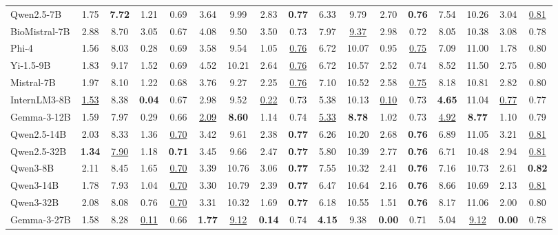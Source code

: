 \begin{table}[t]
{\begin{tabular}{l cccc cccc cccc cccc}
Qwen2.5-7B & 1.75 & \textbf{7.72} & 1.21 & 0.69 & 3.64 & 9.99 & 2.83 & \textbf{0.77} & 6.33 & 9.79 & 2.70 & \textbf{0.76} & 7.54 & 10.26 & 3.04 & \underline{0.81} \\
BioMistral-7B & 2.88 & 8.70 & 3.05 & 0.67 & 4.08 & 9.50 & 3.50 & 0.73 & 7.97 & \underline{9.37} & 2.98 & 0.72 & 8.05 & 10.38 & 3.08 & 0.78 \\
Phi-4 & 1.56 & 8.03 & 0.28 & 0.69 & 3.58 & 9.54 & 1.05 & \underline{0.76} & 6.72 & 10.07 & 0.95 & \underline{0.75} & 7.09 & 11.00 & 1.78 & 0.80 \\
Yi-1.5-9B & 1.83 & 9.17 & 1.52 & 0.69 & 4.52 & 10.21 & 2.64 & \underline{0.76} & 6.72 & 10.57 & 2.52 & 0.74 & 8.52 & 11.50 & 2.75 & 0.80 \\
Mistral-7B & 1.97 & 8.10 & 1.22 & 0.68 & 3.76 & 9.27 & 2.25 & \underline{0.76} & 7.10 & 10.52 & 2.58 & \underline{0.75} & 8.18 & 10.81 & 2.82 & 0.80 \\
InternLM3-8B & \underline{1.53} & 8.38 & \textbf{0.04} & 0.67 & 2.98 & 9.52 & \underline{0.22} & 0.73 & 5.38 & 10.13 & \underline{0.10} & 0.73 & \textbf{4.65} & 11.04 & \underline{0.77} & 0.77 \\
Gemma-3-12B & 1.59 & 7.97 & 0.29 & 0.66 & \underline{2.09} & \textbf{8.60} & 1.14 & 0.74 & \underline{5.33} & \textbf{8.78} & 1.02 & 0.73 & \underline{4.92} & \textbf{8.77} & 1.10 & 0.79 \\
Qwen2.5-14B & 2.03 & 8.33 & 1.36 & \underline{0.70} & 3.42 & 9.61 & 2.38 & \textbf{0.77} & 6.26 & 10.20 & 2.68 & \textbf{0.76} & 6.89 & 11.05 & 3.21 & \underline{0.81} \\
Qwen2.5-32B & \textbf{1.34} & \underline{7.90} & 1.18 & \textbf{0.71} & 3.45 & 9.66 & 2.47 & \textbf{0.77} & 5.80 & 10.39 & 2.77 & \textbf{0.76} & 6.71 & 10.48 & 2.94 & \underline{0.81} \\
Qwen3-8B & 2.11 & 8.45 & 1.65 & \underline{0.70} & 3.39 & 10.76 & 3.06 & \textbf{0.77} & 7.55 & 10.32 & 2.41 & \textbf{0.76} & 7.16 & 10.73 & 2.61 & \textbf{0.82} \\
Qwen3-14B & 1.78 & 7.93 & 1.04 & \underline{0.70} & 3.30 & 10.79 & 2.39 & \textbf{0.77} & 6.47 & 10.64 & 2.16 & \textbf{0.76} & 8.66 & 10.69 & 2.13 & \underline{0.81} \\
Qwen3-32B & 2.08 & 8.08 & 0.76 & \underline{0.70} & 3.31 & 10.32 & 1.69 & \textbf{0.77} & 6.18 & 10.55 & 1.51 & \textbf{0.76} & 8.17 & 11.06 & 2.00 & 0.80 \\
Gemma-3-27B & 1.58 & 8.28 & \underline{0.11} & 0.66 & \textbf{1.77} & \underline{9.12} & \textbf{0.14} & 0.74 & \textbf{4.15} & 9.38 & \textbf{0.00} & 0.71 & 5.04 & \underline{9.12} & \textbf{0.00} & 0.78 \\
\bottomrule
\end{tabular}
}
\end{table}

